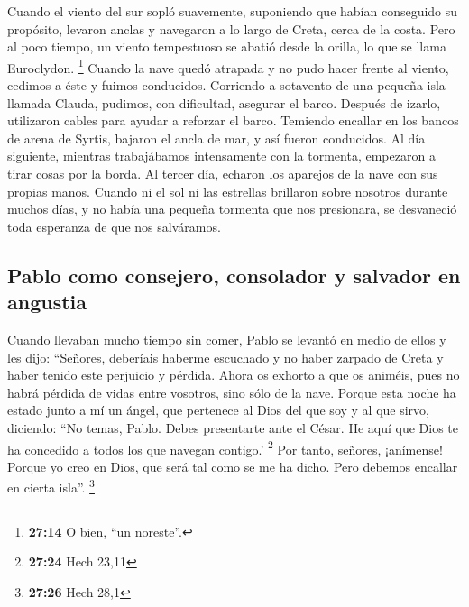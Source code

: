 \begin{paracol}{2}
 Cuando el viento del sur sopló suavemente, suponiendo
que habían conseguido su propósito, levaron anclas y navegaron a lo
largo de Creta, cerca de la costa.  Pero al poco tiempo,
un viento tempestuoso se abatió desde la orilla, lo que se llama
Euroclydon. \footnote{\textbf{27:14} O bien, ``un noreste''.}
 Cuando la nave quedó atrapada y no pudo hacer frente al
viento, cedimos a éste y fuimos conducidos.  Corriendo a
sotavento de una pequeña isla llamada Clauda, pudimos, con dificultad,
asegurar el barco.  Después de izarlo, utilizaron cables
para ayudar a reforzar el barco. Temiendo encallar en los bancos de
arena de Syrtis, bajaron el ancla de mar, y así fueron conducidos.
 Al día siguiente, mientras trabajábamos intensamente con
la tormenta, empezaron a tirar cosas por la borda.  Al
tercer día, echaron los aparejos de la nave con sus propias manos.
 Cuando ni el sol ni las estrellas brillaron sobre
nosotros durante muchos días, y no había una pequeña tormenta que nos
presionara, se desvaneció toda esperanza de que nos salváramos.

\hypertarget{pablo-como-consejero-consolador-y-salvador-en-angustia}{%
\subsection{Pablo como consejero, consolador y salvador en
angustia}\label{pablo-como-consejero-consolador-y-salvador-en-angustia}}

 Cuando llevaban mucho tiempo sin comer, Pablo se levantó
en medio de ellos y les dijo: ``Señores, deberíais haberme escuchado y
no haber zarpado de Creta y haber tenido este perjuicio y pérdida.
 Ahora os exhorto a que os animéis, pues no habrá pérdida
de vidas entre vosotros, sino sólo de la nave.  Porque
esta noche ha estado junto a mí un ángel, que pertenece al Dios del que
soy y al que sirvo,  diciendo: ``No temas, Pablo. Debes
presentarte ante el César. He aquí que Dios te ha concedido a todos los
que navegan contigo.' \footnote{\textbf{27:24} Hech 23,11}
 Por tanto, señores, ¡anímense! Porque yo creo en Dios,
que será tal como se me ha dicho.  Pero debemos encallar
en cierta isla''. \footnote{\textbf{27:26} Hech 28,1}


\end{paracol}
